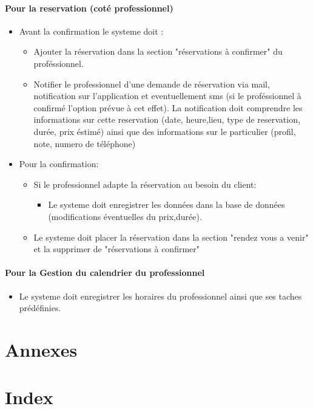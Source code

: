 \documentclass{article}
\begin{document}
\paragraph{Pour la reservation (coté professionnel) }
\begin{itemize}
\item Avant la confirmation le systeme doit :
	\begin{itemize}
	
	\item Ajouter la réservation dans la section "réservations à confirmer" du  proféssionnel.
    \item Notifier le professionnel d'une demande de réservation via mail, notification sur l'application et eventuellement sms (si le proféssionnel à confirmé l'option prévue à cet effet).
		La notification doit comprendre les informations sur cette reservation (date, heure,lieu, type de reservation, durée, prix éstimé)
		ainsi que des informations sur le particulier (profil, note, numero de téléphone)
	\end{itemize}
\item Pour la confirmation:
	\begin{itemize}
	\item Si le professionnel adapte la réservation au besoin du client:
		\begin{itemize}
		\item Le systeme doit enregistrer les données dans la base de données (modifications éventuelles du prix,durée).
		\end{itemize}
	\end{itemize}
	\begin{itemize}
    \item Le systeme doit placer la réservation dans la section "rendez vous a venir" et la supprimer de "réservations à confirmer"
	\end{itemize}
\end{itemize}



\paragraph{Pour la Gestion du calendrier du professionnel }
\begin{itemize}
\item Le systeme doit enregistrer les horaires du professionnel ainsi que ses taches prédéfinies.
\end{itemize}

\section{Annexes}


\section{Index}
\end{document}
